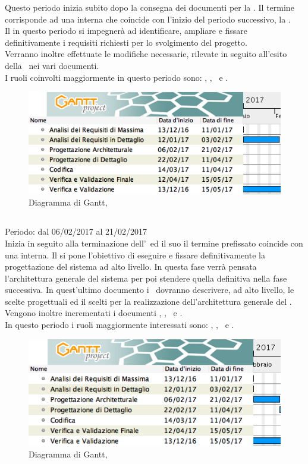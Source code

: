 Questo periodo inizia subito dopo la consegna dei documenti per la \RR. Il termine corrisponde ad una  interna che coincide con l'inizio del periodo successivo, la \PA.\\
Il  in questo periodo si impegnerà ad identificare, ampliare e fissare definitivamente i requisiti richiesti per lo svolgimento del progetto.\\
Verranno inoltre effettuate le modifiche necessarie, rilevate in seguito all'esito della \RR\, nei vari documenti.\\
I ruoli coinvolti maggiormente in questo periodo sono: \An, \Am, \Pm\ e \Ver.

\begin{figure}[H]
	\centering 
	\includegraphics[scale=0.5]{Immagini/Gantt/ARD.png}
	\caption{Diagramma di Gantt, \ARD}
\end{figure}

\subsection{\PA}
Periodo: dal 06/02/2017 al 21/02/2017 \\

Inizia in seguito alla terminazione dell'\ARD\ ed il suo il termine prefissato coincide con una  interna.
Il  si pone l'obiettivo di eseguire e fissare definitivamente la progettazione del sistema ad alto livello. In questa fase verrà pensata l'architettura generale del sistema per poi stendere quella definitiva nella fase successiva.
In quest'ultimo documento i \ProgP\ dovranno descrivere, ad alto livello, le scelte progettuali ed il  scelti per la realizzazione dell'architettura generale del . Vengono inoltre incrementati i documenti \NdP, \PdP, \PdQ\ e \Gl.\\
In questo periodo i ruoli maggiormente interessati sono: \Prog, \Pm, \Ver\ e \Am.

 \begin{figure}[H]
	\centering 
	\includegraphics[scale=0.5]{Immagini/Gantt/PA.png}
	\caption{Diagramma di Gantt, \PA}
\end{figure}

